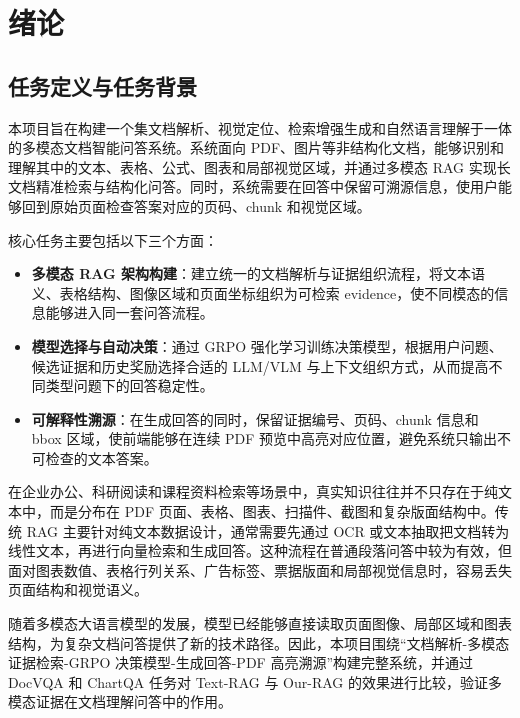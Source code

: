 \chapter{绪论}

\section{任务定义与任务背景}

本项目旨在构建一个集文档解析、视觉定位、检索增强生成和自然语言理解于一体的多模态文档智能问答系统。系统面向 PDF、图片等非结构化文档，能够识别和理解其中的文本、表格、公式、图表和局部视觉区域，并通过多模态 RAG 实现长文档精准检索与结构化问答。同时，系统需要在回答中保留可溯源信息，使用户能够回到原始页面检查答案对应的页码、chunk 和视觉区域。

核心任务主要包括以下三个方面：

\begin{itemize}
  \item \textbf{多模态 RAG 架构构建}：建立统一的文档解析与证据组织流程，将文本语义、表格结构、图像区域和页面坐标组织为可检索 evidence，使不同模态的信息能够进入同一套问答流程。
  \item \textbf{模型选择与自动决策}：通过 GRPO 强化学习训练决策模型，根据用户问题、候选证据和历史奖励选择合适的 LLM/VLM 与上下文组织方式，从而提高不同类型问题下的回答稳定性。
  \item \textbf{可解释性溯源}：在生成回答的同时，保留证据编号、页码、chunk 信息和 bbox 区域，使前端能够在连续 PDF 预览中高亮对应位置，避免系统只输出不可检查的文本答案。
\end{itemize}

在企业办公、科研阅读和课程资料检索等场景中，真实知识往往并不只存在于纯文本中，而是分布在 PDF 页面、表格、图表、扫描件、截图和复杂版面结构中。传统 RAG 主要针对纯文本数据设计，通常需要先通过 OCR 或文本抽取把文档转为线性文本，再进行向量检索和生成回答。这种流程在普通段落问答中较为有效，但面对图表数值、表格行列关系、广告标签、票据版面和局部视觉信息时，容易丢失页面结构和视觉语义。

随着多模态大语言模型的发展，模型已经能够直接读取页面图像、局部区域和图表结构，为复杂文档问答提供了新的技术路径。因此，本项目围绕“文档解析-多模态证据检索-GRPO 决策模型-生成回答-PDF 高亮溯源”构建完整系统，并通过 DocVQA 和 ChartQA 任务对 Text-RAG 与 Our-RAG 的效果进行比较，验证多模态证据在文档理解问答中的作用。
